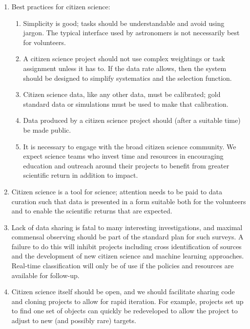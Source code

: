 \documentclass{pasa}
\begin{document}
\begin{enumerate}
\item Best practices for citizen science: 
\begin{enumerate}
\item Simplicity is good; tasks should be understandable and avoid using jargon. The typical interface used by astronomers is not necessarily best for volunteers. 
\item A citizen science project should not use complex weightings or task assignment unless it has to. If the data rate allows, then the system should be designed to simplify systematics and the selection function. 
\item Citizen science data, like any other data, must be calibrated; gold standard data or simulations must be used to make that calibration.
\item Data produced by a citizen science project should (after a suitable time) be made public. %
\item It is necessary to engage with the broad citizen science community. We expect science teams who invest time and resources in encouraging education and outreach around their projects to benefit from greater scientific return in addition to impact. 
\end{enumerate}

\item Citizen science is a tool for science; attention needs to be paid to data curation such that data is presented in a form suitable both for the volunteers and to enable the scientific returns that are expected. 
	
\item Lack of data sharing is fatal to many interesting investigations, and maximal commensal observing should be part of the standard plan for such surveys. A failure to do this will inhibit projects including cross identification of sources and the development of new citizen science and machine learning approaches. Real-time classification will only be of use if the policies and resources are available for follow-up. 

\item Citizen science itself should be open, and we should facilitate sharing code and cloning projects to allow for rapid iteration. For example, projects set up to find one set of objects can quickly be redeveloped to allow the project to adjust to new (and possibly rare) targets.


\end{enumerate}
\end{document}
